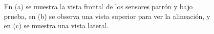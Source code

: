\begin{figure}[H]
\begin{minipage}[b]{0.22\textwidth}
    \end{minipage}
    \caption{En (a) se muestra la vista frontal de los sensores patrón y bajo prueba, en (b) se observa una vista superior para ver la alineación, y en (c) se muestra una vista lateral.}
    \label{fig:bancoMedicionDeltaOhm}
\end{figure} 
 
